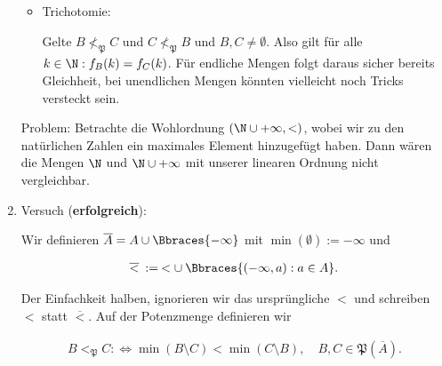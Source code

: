 \begin{solution}
\begin{enumerate}[label = \arabic*.]
\begin{itemize}
    \item Trichotomie:

    Gelte $B \nless_\mathfrak{P} C$ und $C \nless_\mathfrak{P} B$ und $B, C \neq \emptyset$.
    Also gilt für alle $k \in \N: f_B(k) = f_C(k)$.
    Für endliche Mengen folgt daraus sicher bereits Gleichheit, bei unendlichen Mengen könnten vielleicht noch Tricks versteckt sein. \\

  \end{itemize}

  Problem:
  Betrachte die Wohlordnung $(\N \cup +\infty, <)$, wobei wir zu den natürlichen Zahlen ein maximales Element hinzugefügt haben.
  Dann wären die Mengen $\N$ und $\N \cup +\infty$ mit unserer linearen Ordnung nicht vergleichbar.

  \item Versuch (\textbf{erfolgreich}):
  
  Wir definieren $\overline{A} = A \cup \Bbraces{-\infty}$ mit $\min(\emptyset) := -\infty$ und

  \begin{align*}
    \overline < \: := \: < \cup \: \Bbraces{(-\infty, a): a \in A}.
  \end{align*}

  Der Einfachkeit halben, ignorieren wir das ursprüngliche $<$ und schreiben $<$ statt $\overline <$.
  Auf der Potenzmenge definieren wir
  
  \begin{align*}
    B <_\mathfrak{P} C
    : \iff
    \min(B \setminus C) < \min(C \setminus B),
    \quad
    B, C \in \mathfrak{P}(\overline A).
  \end{align*}

  \phantom{}
  
  \begin{center}

    \def \r {1}
    \def \R {1.3}



\end{center}
\end{enumerate}
\end{solution}
